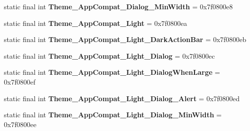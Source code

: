 \begin{DoxyCompactItemize}
\item 
\hypertarget{classandroid_1_1support_1_1design_1_1_r_1_1style_a8340a15f587d3800614ee46322218e0d}{}static final int {\bfseries Theme\+\_\+\+App\+Compat\+\_\+\+Dialog\+\_\+\+Min\+Width} = 0x7f0800e8\label{classandroid_1_1support_1_1design_1_1_r_1_1style_a8340a15f587d3800614ee46322218e0d}

\item 
\hypertarget{classandroid_1_1support_1_1design_1_1_r_1_1style_a919e23b493f57ba6c89a203538a1f629}{}static final int {\bfseries Theme\+\_\+\+App\+Compat\+\_\+\+Light} = 0x7f0800ea\label{classandroid_1_1support_1_1design_1_1_r_1_1style_a919e23b493f57ba6c89a203538a1f629}

\item 
\hypertarget{classandroid_1_1support_1_1design_1_1_r_1_1style_a49d9a5053b6943cad2ad50d5d9d27e6c}{}static final int {\bfseries Theme\+\_\+\+App\+Compat\+\_\+\+Light\+\_\+\+Dark\+Action\+Bar} = 0x7f0800eb\label{classandroid_1_1support_1_1design_1_1_r_1_1style_a49d9a5053b6943cad2ad50d5d9d27e6c}

\item 
\hypertarget{classandroid_1_1support_1_1design_1_1_r_1_1style_a9c51a1db3bd57fcb2ed882ed1dd85829}{}static final int {\bfseries Theme\+\_\+\+App\+Compat\+\_\+\+Light\+\_\+\+Dialog} = 0x7f0800ec\label{classandroid_1_1support_1_1design_1_1_r_1_1style_a9c51a1db3bd57fcb2ed882ed1dd85829}

\item 
\hypertarget{classandroid_1_1support_1_1design_1_1_r_1_1style_ad18470224513598002203a19f9e9afb2}{}static final int {\bfseries Theme\+\_\+\+App\+Compat\+\_\+\+Light\+\_\+\+Dialog\+When\+Large} = 0x7f0800ef\label{classandroid_1_1support_1_1design_1_1_r_1_1style_ad18470224513598002203a19f9e9afb2}

\item 
\hypertarget{classandroid_1_1support_1_1design_1_1_r_1_1style_a38330218cb951a3bf1e25e103383efb9}{}static final int {\bfseries Theme\+\_\+\+App\+Compat\+\_\+\+Light\+\_\+\+Dialog\+\_\+\+Alert} = 0x7f0800ed\label{classandroid_1_1support_1_1design_1_1_r_1_1style_a38330218cb951a3bf1e25e103383efb9}

\item 
\hypertarget{classandroid_1_1support_1_1design_1_1_r_1_1style_af2fcec3a17d1266c1aa09404150083c0}{}static final int {\bfseries Theme\+\_\+\+App\+Compat\+\_\+\+Light\+\_\+\+Dialog\+\_\+\+Min\+Width} = 0x7f0800ee\label{classandroid_1_1support_1_1design_1_1_r_1_1style_af2fcec3a17d1266c1aa09404150083c0}


\end{DoxyCompactItemize}
